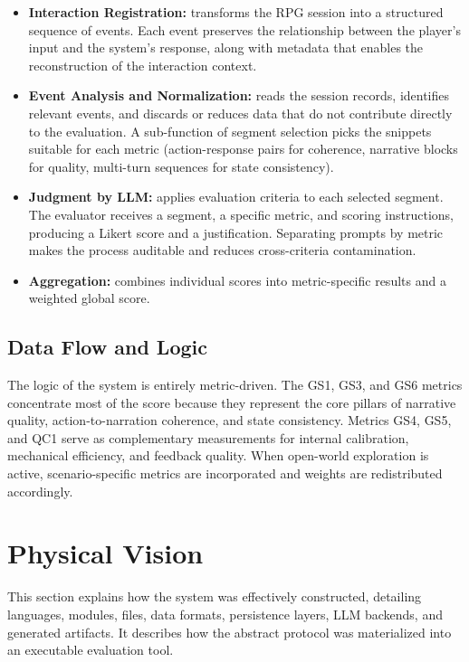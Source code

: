 \documentclass[12pt]{article}
\begin{document}
\begin{itemize}[leftmargin=2.4em,itemsep=2pt]
  \item \textbf{Interaction Registration:} transforms the RPG session into a structured sequence of events. Each event preserves the relationship between the player's input and the system's response, along with metadata that enables the reconstruction of the interaction context.
  \item \textbf{Event Analysis and Normalization:} reads the session records, identifies relevant events, and discards or reduces data that do not contribute directly to the evaluation. A sub-function of segment selection picks the snippets suitable for each metric (action-response pairs for coherence, narrative blocks for quality, multi-turn sequences for state consistency).
  \item \textbf{Judgment by LLM:} applies evaluation criteria to each selected segment. The evaluator receives a segment, a specific metric, and scoring instructions, producing a Likert score and a justification. Separating prompts by metric makes the process auditable and reduces cross-criteria contamination.
  \item \textbf{Aggregation:} combines individual scores into metric-specific results and a weighted global score.
\end{itemize}

\subsection{Data Flow and Logic}

The logic of the system is entirely metric-driven. The GS1, GS3, and GS6 metrics concentrate most of the score because they represent the core pillars of narrative quality, action-to-narration coherence, and state consistency. Metrics GS4, GS5, and QC1 serve as complementary measurements for internal calibration, mechanical efficiency, and feedback quality. When open-world exploration is active, scenario-specific metrics are incorporated and weights are redistributed accordingly.

\section{Physical Vision}
\label{sec:physical}

This section explains how the system was effectively constructed, detailing languages, modules, files, data formats, persistence layers, LLM backends, and generated artifacts. It describes how the abstract protocol was materialized into an executable evaluation tool.
\end{document}
